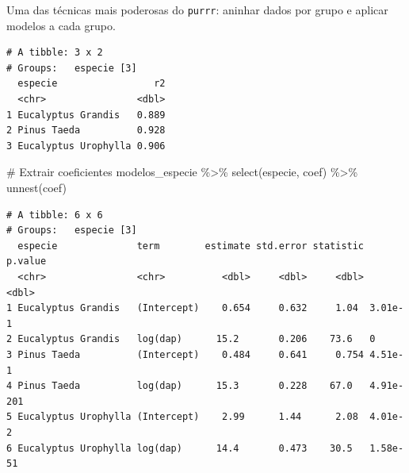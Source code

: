 \documentclass[
  letterpaper,
]{scrbook}
\newenvironment{Shaded}{\begin{snugshade}}{\end{snugshade}}
\newcommand{\AttributeTok}[1]{\textcolor[rgb]{0.40,0.45,0.13}{#1}}
\newcommand{\CommentTok}[1]{\textcolor[rgb]{0.37,0.37,0.37}{#1}}
\newcommand{\FunctionTok}[1]{\textcolor[rgb]{0.28,0.35,0.67}{#1}}
\newcommand{\NormalTok}[1]{\textcolor[rgb]{0.00,0.23,0.31}{#1}}
\newcommand{\OtherTok}[1]{\textcolor[rgb]{0.00,0.23,0.31}{#1}}
\newcommand{\SpecialCharTok}[1]{\textcolor[rgb]{0.37,0.37,0.37}{#1}}
\begin{document}
Uma das técnicas mais poderosas do \texttt{purrr}: aninhar dados por
grupo e aplicar modelos a cada grupo.

\begin{Shaded}
\end{Shaded}

\begin{verbatim}
# A tibble: 3 x 2
# Groups:   especie [3]
  especie                 r2
  <chr>                <dbl>
1 Eucalyptus Grandis   0.889
2 Pinus Taeda          0.928
3 Eucalyptus Urophylla 0.906
\end{verbatim}

\begin{Shaded}
\begin{Highlighting}[]
\CommentTok{\# Extrair coeficientes}
\NormalTok{modelos\_especie }\SpecialCharTok{\%\textgreater{}\%} 
  \FunctionTok{select}\NormalTok{(especie, coef) }\SpecialCharTok{\%\textgreater{}\%} 
  \FunctionTok{unnest}\NormalTok{(coef)}
\end{Highlighting}
\end{Shaded}

\begin{verbatim}
# A tibble: 6 x 6
# Groups:   especie [3]
  especie              term        estimate std.error statistic   p.value
  <chr>                <chr>          <dbl>     <dbl>     <dbl>     <dbl>
1 Eucalyptus Grandis   (Intercept)    0.654     0.632     1.04  3.01e-  1
2 Eucalyptus Grandis   log(dap)      15.2       0.206    73.6   0        
3 Pinus Taeda          (Intercept)    0.484     0.641     0.754 4.51e-  1
4 Pinus Taeda          log(dap)      15.3       0.228    67.0   4.91e-201
5 Eucalyptus Urophylla (Intercept)    2.99      1.44      2.08  4.01e-  2
6 Eucalyptus Urophylla log(dap)      14.4       0.473    30.5   1.58e- 51
\end{verbatim}
\end{document}
